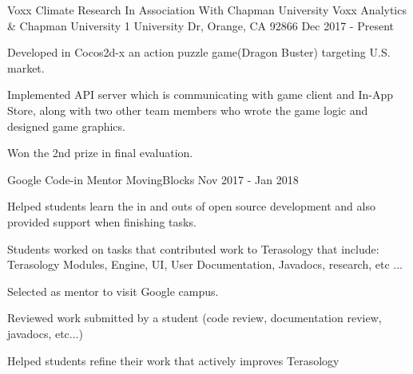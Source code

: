 \begin{cventries}
  \cventry
    {Voxx Climate Research In Association With Chapman University} %
    {Voxx Analytics \& Chapman University} %
    {1 University Dr, Orange, CA 92866} %
    { Dec 2017 - Present} %
    {
      \begin{cvitems} %
        \item {Developed in Cocos2d-x an action puzzle game(Dragon Buster) targeting U.S. market.}
        \item {Implemented API server which is communicating with game client and In-App Store, along with two other team members who wrote the game logic and designed game graphics.}
        \item {Won the 2nd prize in final evaluation.}
      \end{cvitems}
    }


  \cventry
    {Google Code-in Mentor} %
    {MovingBlocks} %
    {} %
    { Nov 2017 - Jan 2018} %
    {
      \begin{cvitems} %
        \item {Helped students learn the in and outs of open source development and also provided support when finishing tasks.}
        \item {Students worked on tasks that contributed work to Terasology that include: Terasology Modules, Engine, UI, User Documentation, Javadocs, research, etc ...}
        \item {Selected as mentor to visit Google campus.}
        \item {Reviewed work submitted by a student (code review, documentation review, javadocs, etc...)}
         \item { Helped students refine their work that actively improves Terasology}
      \end{cvitems}
    }

\end{cventries}
